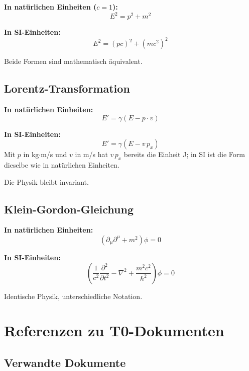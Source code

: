 	\textbf{In natürlichen Einheiten ($c=1$):}
	\begin{equation}
		E^2 = p^2 + m^2
	\end{equation}
	
	\textbf{In SI-Einheiten:}
	\begin{equation}
		E^2 = (pc)^2 + (mc^2)^2
	\end{equation}
	
	Beide Formen sind mathematisch äquivalent.
	
	\subsection{Lorentz-Transformation}
	
	\textbf{In natürlichen Einheiten:}
	\begin{equation}
		E' = \gamma (E - p \cdot v)
	\end{equation}
	
	\textbf{In SI-Einheiten:}
	\begin{equation}
		E' = \gamma (E - v\, p_x)
	\end{equation}
	Mit $p$ in kg$\cdot$m/s und $v$ in m/s hat $v\,p_x$ bereits die Einheit J; in SI ist die Form dieselbe wie in natürlichen Einheiten.
	
	Die Physik bleibt invariant.
	
	\subsection{Klein-Gordon-Gleichung}
	
	\textbf{In natürlichen Einheiten:}
	\begin{equation}
		(\partial_\mu \partial^\mu + m^2) \phi = 0
	\end{equation}
	
	\textbf{In SI-Einheiten:}
	\begin{equation}
		\left(\frac{1}{c^2} \frac{\partial^2}{\partial t^2} - \nabla^2 + \frac{m^2c^2}{\hbar^2}\right) \phi = 0
	\end{equation}
	
	Identische Physik, unterschiedliche Notation.
	
	\section{Referenzen zu T0-Dokumenten}
	
	\subsection{Verwandte Dokumente}
	
